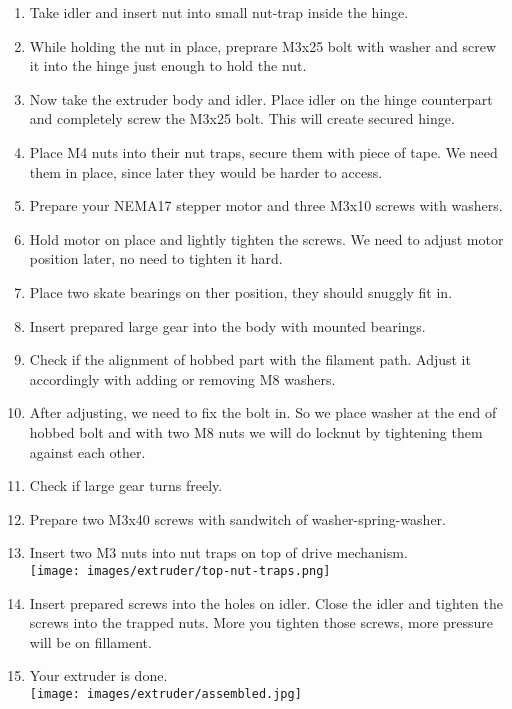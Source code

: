 \documentclass[11pt]{article}
\begin{document}
\begin{enumerate}
\item Take idler and insert nut into small nut-trap inside the hinge.
\item While holding the nut in place, preprare M3x25 bolt with washer and screw it into the hinge just enough to hold the nut.
\item Now take the extruder body and idler. Place idler on the hinge counterpart and completely screw the M3x25 bolt. This will create secured hinge.
\item Place M4 nuts into their nut traps, secure them with piece of tape. We need them in place, since later they would be harder to access.
\item Prepare your NEMA17 stepper motor and three M3x10 screws with washers.
\item Hold motor on place and lightly tighten the screws. We need to adjust motor position later, no need to tighten it hard.
\item Place two skate bearings on ther position, they should snuggly fit in.
\item Insert prepared large gear into the body with mounted bearings.
\item Check if the alignment of hobbed part with the filament path. Adjust it accordingly with adding or removing M8 washers.
\item After adjusting, we need to fix the bolt in. So we place washer at the end of hobbed bolt and with two M8 nuts we will do locknut by tightening them against each other.
\item Check if large gear turns freely.
\item Prepare two M3x40 screws with sandwitch of washer-spring-washer.
\item Insert two M3 nuts into nut traps on top of drive mechanism.\\ \texttt{[image: images/extruder/top-nut-traps.png]}
\item Insert prepared screws into the holes on idler. Close the idler and tighten the screws into the trapped nuts. More you tighten those screws, more pressure will be on fillament.
\item Your extruder is done.\\ \texttt{[image: images/extruder/assembled.jpg]}
\end{enumerate}
\end{document}
